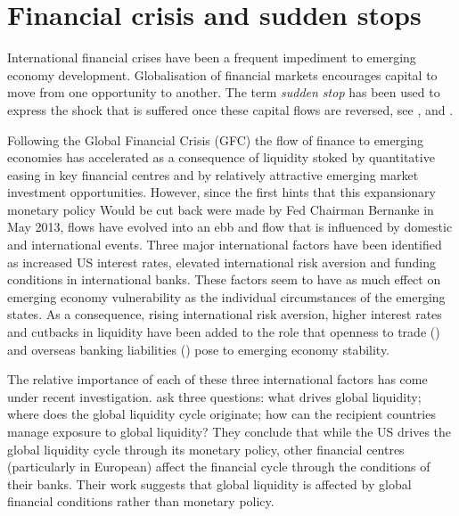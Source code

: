 \documentclass[12pt, a4paper, oneside]{article}\usepackage[]{graphicx}\usepackage[]{color}
\begin{document}
\section{Financial crisis and sudden stops}
  International financial crises have been a frequent impediment to emerging economy development.  Globalisation of financial markets encourages capital to move from one opportunity to another. The term \emph{sudden stop} has been used to express the shock that is suffered once these capital flows are reversed, see \citet{DornbuschSS}, \citet{CalvoSS} and \citet{KrugmanSS}.    %
 
  Following the Global Financial Crisis (GFC) the flow of finance to emerging economies has accelerated as a consequence of liquidity stoked by quantitative easing in key financial centres and by relatively attractive emerging market investment opportunities.  However, since the first hints that this expansionary monetary policy Would be cut back were made by Fed Chairman Bernanke in May 2013, flows have evolved into an ebb and flow that is influenced by domestic and international events.  Three major international factors have been identified as increased US interest rates, elevated international risk aversion and funding conditions in international banks. These factors seem to have as much effect on emerging economy vulnerability as the individual circumstances of the emerging states.  As a consequence,  rising international risk aversion, higher interest rates and cutbacks in liquidity have been added to the role that openness to trade (\citet{Cavallo20081430}) and overseas banking liabilities (\citet{calvo2004empiric}) pose to emerging economy stability.   

The relative importance of each of these three international factors has come under recent investigation.  \citet{Cerutti2014} ask three questions:  what drives global liquidity; where does the global liquidity cycle originate; how can the recipient countries manage exposure to global liquidity?  They conclude that while the US drives the global liquidity cycle through its monetary policy, other financial centres (particularly in European) affect the financial cycle through the conditions of their banks. Their work suggests that global liquidity is affected by global financial conditions rather than monetary policy.
\end{document}

